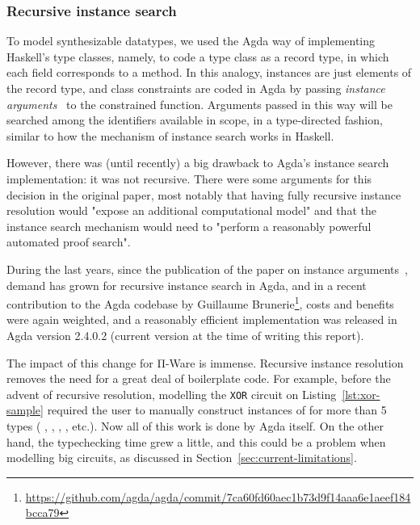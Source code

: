             \subsubsection{Recursive instance search}
            To model synthesizable datatypes, we used the Agda way of implementing Haskell's type classes,
            namely, to code a type class as a record type, in which each field corresponds to a method.
            In this analogy, instances are just elements of the record type, and class constraints are
            coded in Agda by passing \emph{instance arguments}~\cite{typeclasses-agda} to the constrained function.
            Arguments passed in this way will be searched among the identifiers available in scope,
            in a type-directed fashion, similar to how the mechanism of instance search works in Haskell.

            However, there was (until recently) a big drawback to Agda's instance search implementation:
            it was not recursive.
            There were some arguments for this decision in the original paper,
            most notably that having fully recursive instance resolution would
            "expose an additional computational model" and that the instance search mechanism
            would need to "perform a reasonably powerful automated proof search".

            During the last years, since the publication of the paper on instance arguments~\cite{typeclasses-agda},
            demand has grown for recursive instance search in Agda, and in a recent contribution to the Agda codebase
            by Guillaume Brunerie\footnote{\url{https://github.com/agda/agda/commit/7ca60fd60aec1b73d9f14aaa6e1aeef184bcca79}},
            costs and benefits were again weighted, and a reasonably efficient implementation was released
            in Agda version 2.4.0.2 (current version at the time of writing this report).

            The impact of this change for Π-Ware is immense.
            Recursive instance resolution removes the need for a great deal of boilerplate code.
            For example, before the advent of recursive resolution, modelling the \texttt{XOR} circuit
            on Listing~\ref{lst:xor-sample} required the user to manually construct instances of 
            for more than 5 types
            (   
            , \AY{(}  \AY{)}  
            ,   \AY{(}  \AY{)}
            , \AY{(}  \AY{(}  \AY{)}\AY{)}  \AY{(}  \AY{)}
            , etc.).
            Now all of this work is done by Agda itself.
            On the other hand, the typechecking time grew a little,
            and this could be a problem when modelling big circuits, as discussed in Section~\ref{sec:current-limitations}.


